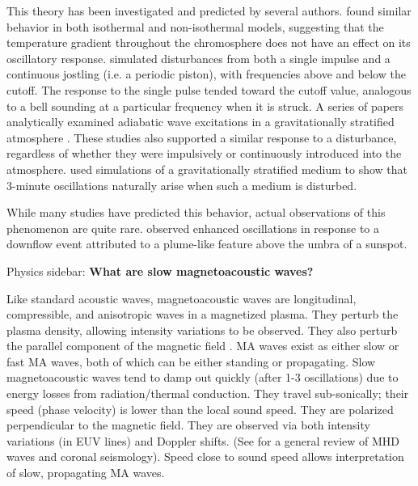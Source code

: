 This theory has been investigated and predicted by several authors.
\cite{Fleck1991} found similar behavior in
both isothermal and non-isothermal models, suggesting that the temperature
gradient throughout the chromosphere does not have an effect on its oscillatory
response. \cite{Kalkofen1994} simulated disturbances from both a single impulse
and a continuous jostling (i.e. a periodic piston), with frequencies above and
below the cutoff. The response to the single pulse tended toward the cutoff
value, analogous to a bell sounding at a particular frequency when it is
struck. A series of papers analytically examined adiabatic wave excitations in
a gravitationally stratified atmosphere \citep{Sutmann1995a, Sutmann1995b,
Sutmann1998}. These studies also supported a similar response to a disturbance,
regardless of whether they were impulsively or continuously introduced into the
atmosphere. \cite{Chae2015} used simulations of a gravitationally stratified
medium to show that 3-minute oscillations naturally arise when such a medium is
disturbed.

While many studies have predicted this behavior,
actual observations of this phenomenon are quite rare.
\cite{Kwak2016}
observed enhanced oscillations in response to a downflow
event attributed to a plume-like feature above the umbra of a sunspot.


\begin{framed}
    Physics sidebar: \textbf{What are slow magnetoacoustic waves?}

    Like standard acoustic waves, magnetoacoustic waves are longitudinal,
    compressible, and anisotropic waves in a magnetized plasma.
    They perturb the plasma density, allowing intensity variations to be
    observed.
    They also perturb the parallel component of the magnetic field
    .
    MA waves exist as either slow or fast MA waves, both of which can be either
    standing or propagating.
    Slow magnetoacoustic waves tend to damp out
    quickly (after 1-3 oscillations) due to energy losses from
    radiation/thermal conduction.
    They travel sub-sonically; their
    speed (phase velocity) is lower than the local sound speed.
    They are polarized perpendicular to the magnetic field.
    They are observed
    via both intensity variations (in EUV lines) and Doppler shifts.
    (See \cite{Nakariakov2005} for a general review of MHD waves and coronal
    seismology).
    Speed close to sound speed
    allows interpretation of slow, propagating MA waves.
\end{framed}





%
%
%


\newpage

